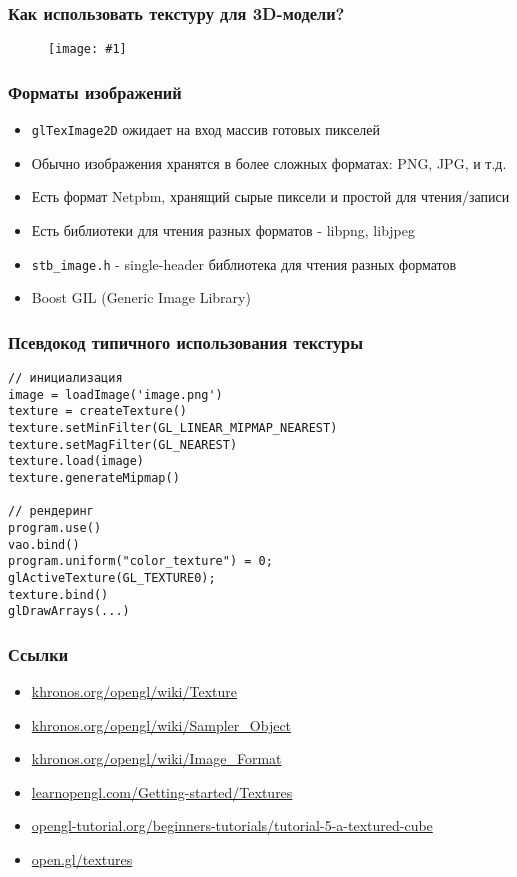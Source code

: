 \documentclass{beamer}
\newcommand{\slideimage}[1]{
  \begin{figure}
    \begin{adjustbox}{width=\textwidth, totalheight=\textheight-2\baselineskip-2\baselineskip,keepaspectratio}
      \texttt{[image: \#1]}
    \end{adjustbox}
  \end{figure}
}
\begin{document}
\begin{frame}[fragile]
\frametitle{Как использовать текстуру для 3D-модели?}
\slideimage{uv.jpg}
\end{frame}

\begin{frame}[fragile]
\frametitle{Форматы изображений}
\begin{itemize}
\item \verb|glTexImage2D| ожидает на вход массив готовых пикселей
\pause
\item Обычно изображения хранятся в более сложных форматах: PNG, JPG, и т.д.
\pause
\item Есть формат Netpbm, хранящий сырые пиксели и простой для чтения/записи
\pause
\item Есть библиотеки для чтения разных форматов - libpng, libjpeg
\pause
\item \verb|stb_image.h| - single-header библиотека для чтения разных форматов
\pause
\item Boost GIL (Generic Image Library)
\end{itemize}
\end{frame}

\begin{frame}[fragile]
\frametitle{Псевдокод типичного использования текстуры}
\begin{verbatim}
// инициализация
image = loadImage('image.png')
texture = createTexture()
texture.setMinFilter(GL_LINEAR_MIPMAP_NEAREST)
texture.setMagFilter(GL_NEAREST)
texture.load(image)
texture.generateMipmap()

// рендеринг
program.use()
vao.bind()
program.uniform("color_texture") = 0;
glActiveTexture(GL_TEXTURE0);
texture.bind()
glDrawArrays(...)
\end{verbatim}
\end{frame}

\begin{frame}[fragile]
\frametitle{Ссылки}
\begin{itemize}
\item \href{https://www.khronos.org/opengl/wiki/Texture}{khronos.org/opengl/wiki/Texture}
\item \href{https://www.khronos.org/opengl/wiki/Sampler_Object}{khronos.org/opengl/wiki/Sampler\_Object}
\item \href{https://www.khronos.org/opengl/wiki/Image_Format}{khronos.org/opengl/wiki/Image\_Format}
\item \href{https://learnopengl.com/Getting-started/Textures}{learnopengl.com/Getting-started/Textures}
\item \href{http://www.opengl-tutorial.org/beginners-tutorials/tutorial-5-a-textured-cube}{opengl-tutorial.org/beginners-tutorials/tutorial-5-a-textured-cube}
\item \href{https://open.gl/textures}{open.gl/textures}
\end{itemize}
\end{frame}
\end{document}
